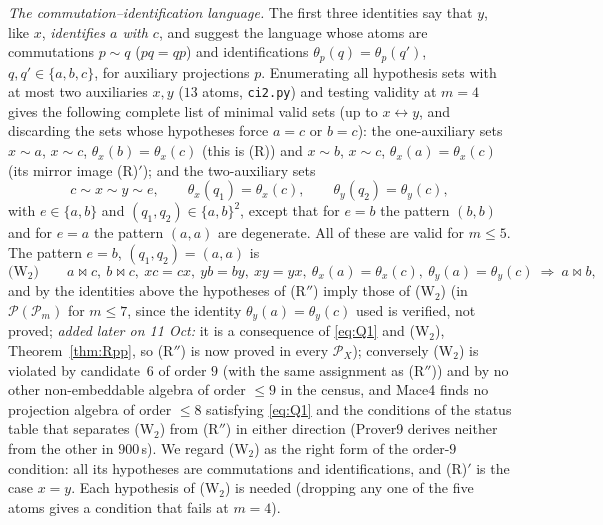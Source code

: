 \documentclass[11pt]{amsart}
\theoremstyle{definition}
\renewcommand{\P}{\mathcal{P}}
\newcommand{\mt}{\bowtie}   %
\begin{document}
\smallskip
\emph{The commutation--identification language.} The first three identities say that $y$, like $x$, \emph{identifies $a$ with $c$}, and suggest the language whose atoms are commutations $p\sim q$ ($pq=qp$) and identifications $\theta_p(q)=\theta_p(q')$, $q,q'\in\{a,b,c\}$, for auxiliary projections $p$. Enumerating all hypothesis sets with at most two auxiliaries $x,y$ ($13$ atoms, \texttt{ci2.py}) and testing validity at $m=4$ gives the following complete list of minimal valid sets (up to $x\leftrightarrow y$, and discarding the sets whose hypotheses force $a=c$ or $b=c$): the one-auxiliary sets $x\sim a$, $x\sim c$, $\theta_x(b)=\theta_x(c)$ (this is (R)) and $x\sim b$, $x\sim c$, $\theta_x(a)=\theta_x(c)$ (its mirror image (R)$'$); and the two-auxiliary sets
\[
c\sim x\sim y\sim e,\qquad \theta_x(q_1)=\theta_x(c),\qquad \theta_y(q_2)=\theta_y(c),
\]
with $e\in\{a,b\}$ and $(q_1,q_2)\in\{a,b\}^2$, except that for $e=b$ the pattern $(b,b)$ and for $e=a$ the pattern $(a,a)$ are degenerate. All of these are valid for $m\le5$. The pattern $e=b$, $(q_1,q_2)=(a,a)$ is
\begin{equation}\label{eq:W2}
\text{(W$_2$)}\qquad a\mt c,\ b\mt c,\ xc=cx,\ yb=by,\ xy=yx,\ \theta_x(a)=\theta_x(c),\ \theta_y(a)=\theta_y(c)\ \Longrightarrow\ a\mt b ,
\end{equation}
and by the identities above the hypotheses of (R$''$) imply those of (W$_2$) (in $\P(\P_m)$ for $m\le7$, since the identity $\theta_y(a)=\theta_y(c)$ used is verified, not proved; \emph{added later on 11 Oct:} it is a consequence of \eqref{eq:Q1} and (W$_2$), Theorem~\ref{thm:Rpp}, so (R$''$) is now proved in every $\P_X$); conversely (W$_2$) is violated by candidate~$6$ of order $9$ (with the same assignment as (R$''$)) and by no other non-embeddable algebra of order $\le9$ in the census, and Mace4 finds no projection algebra of order $\le8$ satisfying \eqref{eq:Q1} and the conditions of the status table that separates (W$_2$) from (R$''$) in either direction (Prover9 derives neither from the other in $900$\,s). We regard (W$_2$) as the right form of the order-$9$ condition: all its hypotheses are commutations and identifications, and (R)$'$ is the case $x=y$. Each hypothesis of (W$_2$) is needed (dropping any one of the five atoms gives a condition that fails at $m=4$).
\end{document}
